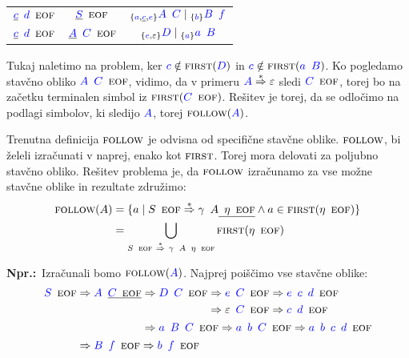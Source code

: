 \documentclass{article}
\newcommand{\Ex}{\textbf{Npr.:}\ }
\newcommand{\FIRST}{\textsc{first}}
\newcommand{\FOLLOW}{\textsc{follow}}
\newcommand{\EOF}{\textsc{eof}}
\newcommand{\Symbol}[1]{\textcolor{blue}{#1}}
\newcommand{\Null}{\varepsilon}
\newcommand{\Derive}{\Rightarrow}
\newcommand{\DeriveStar}{\overset{\ast}{\Rightarrow}}
\newcommand{\Seq}{{\ \,}}
\newcommand{\Union}{\mathrel{|}}
\newcommand{\Lookahead}[1]{{}_{\{{#1}\}}}
\begin{document}
\begin{center}
\begin{tabular}{|c|c|c|}
  \hline
  $\underline{\Symbol{c}} \Seq \Symbol{d} \Seq \EOF$ & $\underline{\Symbol{S}} \Seq \EOF$ & $\Lookahead{\Symbol{a}, \underline{\Symbol{c}}, \Symbol{e}} \Symbol{A} \Seq \Symbol{C} \Union \Lookahead{\Symbol{b}} \Symbol{B} \Seq \Symbol{f}$ \\ 
  $\underline{\Symbol{c}} \Seq \Symbol{d} \Seq \EOF$ & $\underline{\Symbol{A}} \Seq \Symbol{C} \Seq \EOF$ & $\Lookahead{\Symbol{e}, \Null} \Symbol{D} \Union \Lookahead{\Symbol{a}} \Symbol{a} \Seq \Symbol{B}$ \\ 
  \hline
\end{tabular}
\end{center}
Tukaj naletimo na problem, ker $\Symbol{c} \notin \FIRST(\Symbol{D})$ in $\Symbol{c} \notin \FIRST(\Symbol{a} \Seq \Symbol{B})$.
Ko pogledamo stavčno obliko $\Symbol{A} \Seq \Symbol{C} \Seq \EOF$, vidimo, da v primeru $\Symbol{A} \DeriveStar \varepsilon$ sledi $\Symbol{C} \Seq \EOF$, torej bo na začetku terminalen simbol iz $\FIRST(\Symbol{C} \Seq \EOF)$.
Rešitev je torej, da se odločimo na podlagi simbolov, ki sledijo $\Symbol{A}$, torej $\FOLLOW(\Symbol{A})$.

Trenutna definicija $\FOLLOW$ je odvisna od specifične stavčne oblike.
$\FOLLOW$, bi želeli izračunati v naprej, enako kot $\FIRST$.
Torej mora delovati za poljubno stavčno obliko.
Rešitev problema je, da $\FOLLOW$ izračunamo za vse možne stavčne oblike in rezultate združimo:
\begin{align*}
  \FOLLOW(A) &= \{a \mid S \Seq \EOF \DeriveStar \gamma \Seq A \underline{\Seq \eta \Seq \EOF} \land a \in \FIRST(\eta \Seq \EOF)\}\\
  &= \bigcup_{S \Seq \EOF\ \DeriveStar\ \gamma \Seq A \Seq \eta \Seq \EOF} \FIRST(\eta \Seq \EOF)
\end{align*}

\Ex Izračunali bomo $\FOLLOW(\Symbol{A})$.
Najprej poiščimo vse stavčne oblike:
\begin{equation*}
  \Symbol{S} \Seq \EOF \begin{aligned}[t]
    &\Derive \Symbol{A} \Seq \underline{\Symbol{C} \Seq \EOF} \begin{aligned}[t]
      &\Derive \Symbol{D} \Seq \Symbol{C} \Seq \EOF \begin{aligned}[t]
        &\Derive \Symbol{e} \Seq \Symbol{C} \Seq \EOF \Derive \Symbol{e} \Seq \Symbol{c} \Seq \Symbol{d} \Seq \EOF \\
        &\Derive \Null \Seq \Symbol{C} \Seq \EOF \Derive \Symbol{c} \Seq \Symbol{d} \Seq \EOF \\
      \end{aligned}\\
      &\Derive \Symbol{a} \Seq \Symbol{B} \Seq \Symbol{C} \Seq \EOF \Derive \Symbol{a} \Seq \Symbol{b} \Seq \Symbol{C} \Seq \EOF \Derive \Symbol{a} \Seq \Symbol{b} \Seq \Symbol{c} \Seq \Symbol{d} \Seq \EOF
    \end{aligned}\\
    &\Derive \Symbol{B} \Seq \Symbol{f} \Seq \EOF \Derive \Symbol{b} \Seq \Symbol{f} \Seq \EOF
  \end{aligned}
\end{equation*}
\end{document}
